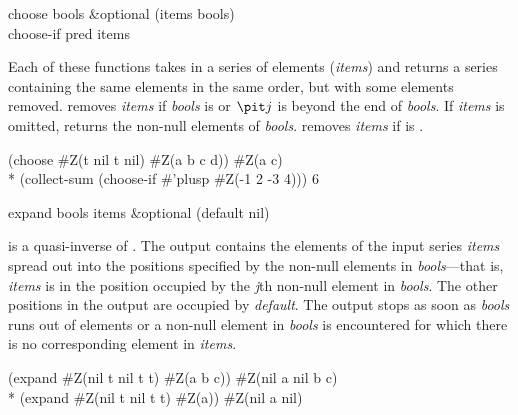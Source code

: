 \begin{defun}[Function]
choose bools &optional (items bools) \\
choose-if pred items

Each of these functions takes in a series of elements ({\it items}) and
returns a series containing the same elements in the same order, but with
some elements removed.   removes {\it items} if {\it
bools} is  or ${\it j}$ is beyond the end of {\it bools}.  If {\it
items} is omitted,  returns the non-null elements of {\it
bools}.   removes {\it items} if 
 is .
\begin{lisp}
(choose \#Z(t nil t nil) \#Z(a b c d)) {\EV} \#Z(a c) \\*
(collect-sum (choose-if \#'plusp \#Z(-1 2 -3 4))) {\EV} 6
\end{lisp}
\end{defun}

\begin{defun}[Function]
expand bools items &optional (default nil)

 is a quasi-inverse of .  The output contains the
elements of the input series {\it items} spread out into the positions
specified by the non-null elements
in {\it bools}---that is, {\it items}
is in the position occupied by the {\it j\/}th non-null element in {\it bools}.
The other positions in the output are occupied by {\it default}.  The
output stops as soon as {\it bools} runs out of elements or a non-null
element in {\it bools} is encountered for which there is no corresponding
element in {\it items}.
\begin{lisp}
(expand \#Z(nil t nil t t) \#Z(a b c)) {\EV} \#Z(nil a nil b c) \\*
(expand \#Z(nil t nil t t) \#Z(a)) {\EV} \#Z(nil a nil)
\end{lisp}
\end{defun}

